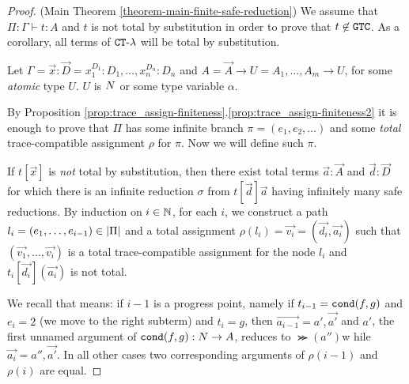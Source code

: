 \begin{proof}(Main Theorem \ref{theorem-main-finite-safe-reduction})
  We assume that $\Pi:\Gamma \vdash t: A$ 
  and $t$ is not total by substitution in order to prove that
  $t \not \in {\tt GTC}$. As a corollary, all terms of ${ {\tt CT}\mbox{-}\lambda}$ will be total by substitution.
 
  Let $\Gamma = \vec{x}:\vec{D} = x_1^{D_1}:D_1, \ldots, x_n^{D_n}:D_n$ 
  and $A = \vec{A}\rightarrow U = A_1, \ldots, A_m \rightarrow U$, 
  for some \emph{atomic} type $U$. $U$ is ${N}$ or some type variable $\alpha$.
   
  By Proposition \ref{prop:trace_assign-finiteness}.\ref{prop:trace_assign-finiteness2} 
  it is enough to prove that
  $\Pi$ has some infinite branch $\pi=(e_1, e_2, \ldots)$ 
  and some \emph{total} trace-compatible assignment $\rho$ for $\pi$.
  Now we will define such $\pi$.
  
  If $t[\vec{x}]$ is \emph{not} total by substitution, then 
  there exist total terms $\vec{a}:\vec{A}$ and $\vec{d}:\vec{D}$ for which there is
  an infinite reduction $\sigma$ from $t[\vec{d}]\vec{a}$ having infinitely many safe  
  reductions.
  By induction on $i \in \mathbb{N}$, for each $i$, we construct a path 
  $l_i = (e_1,\ldots,e_{i-1}) \in {|\Pi|}$
  and a total assignment $\rho(l_i) = \vec{v_i} = (\vec{d_i},\vec{a_i})$ such that
  $(\vec{v_1},\ldots,\vec{v_i})$ is a total trace-compatible assignment for the node $l_i$
  and $t_{i}[\vec{d_{i}}](\vec{a_{i}})$ is not total.

  
 We recall that  means: 
 if $i-1$ is a progress point, namely if $t_{i-1}={\tt cond}(f,g)$ and $e_i=2$ 
 (we move to the right subterm) and $t_i=g$, then $\vec{a_{i-1}} = a',\vec{a'}$ 
 and $a'$, the first unnamed argument of ${\tt cond}(f,g) : {N} \rightarrow A$, 
 reduces to $\Succ(a'')$w hile $\vec{a_i} = a'',\vec{a'}$.
 In all other cases two corresponding arguments of $\rho(i-1)$ and $\rho(i)$ are equal.


\end{proof}
